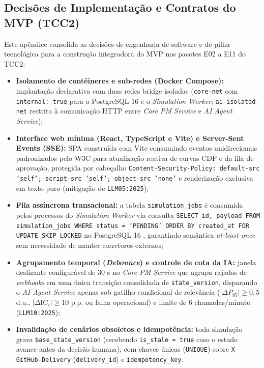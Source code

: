 \documentclass[12pt,openany,oneside,a4paper,english,brazilian,sumario=tradicional]{abntex2}
\newcommand{\IC}{\mathrm{IC}}
\begin{document}
\begin{apendicesenv}
\partapendices

\chapter{Decisões de Implementação e Contratos do MVP (TCC2)}\label{apd:mvp}

Este apêndice consolida as decisões de engenharia de software e de pilha tecnológica para a construção integradora do MVP nos pacotes E02 a E11 do TCC2:
\begin{itemize}
  \item \textbf{Isolamento de contêineres e sub-redes (Docker Compose):} implantação declarativa \cite{merkel2014} com duas redes bridge isoladas (\texttt{core-net} com \texttt{internal: true} para o PostgreSQL 16 e o \textit{Simulation Worker}; \texttt{ai-isolated-net} restrita à comunicação HTTP entre \textit{Core PM Service} e \textit{AI Agent Service});
  \item \textbf{Interface web mínima (React, TypeScript e Vite) e Server-Sent Events (SSE):} SPA construída com Vite \cite{vite2024} consumindo eventos unidirecionais padronizados pelo W3C \cite{w3c2015} para atualização reativa de curvas CDF e da fila de aprovação, protegida por cabeçalho \texttt{Content-Security-Policy:}\allowbreak\ \texttt{default-src 'self';}\allowbreak\ \texttt{script-src 'self';}\allowbreak\ \texttt{object-src 'none'} e renderização exclusiva em texto puro (mitigação de \texttt{LLM05:2025});
  \item \textbf{Fila assíncrona transacional:} a tabela \texttt{simulation\_jobs} é consumida pelos processos do \textit{Simulation Worker} via consulta \texttt{SELECT id, payload FROM simulation\_jobs WHERE status = 'PENDING' ORDER BY created\_at FOR UPDATE SKIP LOCKED} no PostgreSQL 16 \cite{postgresql2024}, garantindo semântica \textit{at-least-once} sem necessidade de manter corretores externos;
  \item \textbf{Agrupamento temporal (\textit{Debounce}) e controle de cota da IA:} janela deslizante configurável de 30 s no \textit{Core PM Service} que agrupa rajadas de \textit{webhooks} em uma única transição consolidada de \texttt{state\_version}, disparando o \textit{AI Agent Service} apenas sob gatilho condicional de relevância ($|\Delta P_{85}| \ge 0{,}5$ d.u., $|\Delta\IC_i| \ge 10$ p.p. ou falha operacional) e limite de 6 chamadas/minuto (\texttt{LLM10:2025});
  \item \textbf{Invalidação de cenários obsoletos e idempotência:} toda simulação grava \texttt{base\_state\_version} (recebendo \texttt{is\_stale = true} caso o estado avance antes da decisão humana), com chaves únicas (\texttt{UNIQUE}) sobre \texttt{X-GitHub-Delivery} (\texttt{delivery\_id}) e \texttt{idempotency\_key}.
\end{itemize}


\end{apendicesenv}
\end{document}
